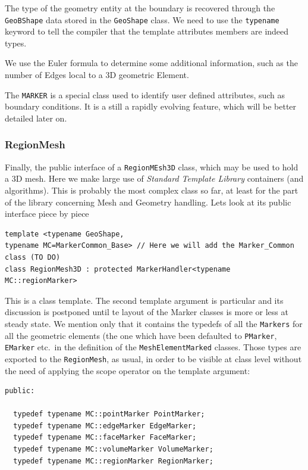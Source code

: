 The type of the geometry entity at the boundary is recovered through
the \texttt{GeoBShape} data stored in the \texttt{GeoShape} class. We
need to use the \texttt{typename} keyword to tell the compiler that
the template attributes members are indeed types.

We use the Euler formula to determine some additional information,
such as the number of Edges local to a 3D geometric Element.

The \texttt{MARKER} is a special class used to identify user defined
attributes, such as boundary conditions. It is a still a rapidly
evolving feature, which will be better detailed later on.
\subsubsection{RegionMesh}
Finally, the public interface of a \texttt{RegionMEsh3D} class, which
may be used to hold a 3D mesh.  Here we make large use of
\emph{Standard Template Library} containers (and algorithms). This is
probably the most complex class so far, at least for the part of the
library concerning Mesh and Geometry handling.
Lets look at its public interface piece by piece

\begin{verbatim}
template <typename GeoShape, 
typename MC=MarkerCommon_Base> // Here we will add the Marker_Common class (TO DO)
class RegionMesh3D : protected MarkerHandler<typename MC::regionMarker>
\end{verbatim}
This is a class template. The second template argument is particular
and its discussion is postponed until te layout of the Marker classes
is more or less at steady state.  We mention only that it contains the
typedefs of all the \texttt{Markers} for all the geometric elements
(the one which have been defaulted to \texttt{PMarker},
\texttt{EMarker} etc.\  in the definition of the \texttt{MeshElementMarked}
classes.  Those types are exported to the \texttt{RegionMesh}, as
usual, in order to be visible at class level without the need of
applying the scope operator on the template argument:
\begin{verbatim}
public:

  typedef typename MC::pointMarker PointMarker;
  typedef typename MC::edgeMarker EdgeMarker;
  typedef typename MC::faceMarker FaceMarker;
  typedef typename MC::volumeMarker VolumeMarker;
  typedef typename MC::regionMarker RegionMarker;
\end{verbatim}

